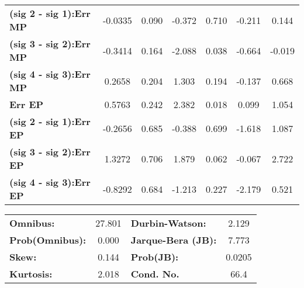 \begin{center}
\begin{tabular}{lcccccc}
\textbf{(sig 2 - sig 1):Err MP} &      -0.0335  &        0.090     &    -0.372  &         0.710        &       -0.211    &        0.144     \\
\textbf{(sig 3 - sig 2):Err MP} &      -0.3414  &        0.164     &    -2.088  &         0.038        &       -0.664    &       -0.019     \\
\textbf{(sig 4 - sig 3):Err MP} &       0.2658  &        0.204     &     1.303  &         0.194        &       -0.137    &        0.668     \\
\textbf{Err EP}                 &       0.5763  &        0.242     &     2.382  &         0.018        &        0.099    &        1.054     \\
\textbf{(sig 2 - sig 1):Err EP} &      -0.2656  &        0.685     &    -0.388  &         0.699        &       -1.618    &        1.087     \\
\textbf{(sig 3 - sig 2):Err EP} &       1.3272  &        0.706     &     1.879  &         0.062        &       -0.067    &        2.722     \\
\textbf{(sig 4 - sig 3):Err EP} &      -0.8292  &        0.684     &    -1.213  &         0.227        &       -2.179    &        0.521     \\
\bottomrule
\end{tabular}
\end{center}\begin{center}
\begin{tabular}{lclc}
\toprule
\textbf{Omnibus:}       & 27.801 & \textbf{  Durbin-Watson:     } &    2.129  \\
\textbf{Prob(Omnibus):} &  0.000 & \textbf{  Jarque-Bera (JB):  } &    7.773  \\
\textbf{Skew:}          &  0.144 & \textbf{  Prob(JB):          } &   0.0205  \\
\textbf{Kurtosis:}      &  2.018 & \textbf{  Cond. No.          } &     66.4  \\
\bottomrule
\end{tabular}
\end{center}




